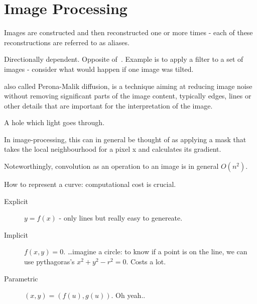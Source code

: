 \section{Image Processing}

\begin{definition}[Aliasing]
    Images are constructed and then reconstructed one or more times - 
    each of these reconstructions are referred to as aliases.
\end{definition}

\begin{definition}[Anisotropy]\label{anisotropy}
    Directionally dependent. Opposite of~.
    Example is to apply a filter to a set of images - consider
    what would happen if one image was tilted.
\end{definition}

\begin{definition}
    also called Perona-Malik diffusion, is a technique aiming at reducing image
    noise without removing significant parts of the image content, typically
    edges, lines or other details that are important for the interpretation of
    the image.

\end{definition}

\begin{definition}[Aperture]
    A hole which light goes through.
\end{definition}

\begin{definition}[Convolution]\label{convolution}
    In image-processing, this can in general be thought of as applying a mask
    that takes the local neighbourhood for a pixel x and calculates its
    gradient.

    Noteworthingly, convolution as an operation to an image is in general
    $O(n^{2})$.
\end{definition}

\begin{definition}
    How to represent a curve: computational cost is crucial.

    \begin{description}
        \item[Explicit] $y = f(x)$ - only lines but really easy to genereate.
        \item[Implicit] $f(x,y) = 0$. \dots imagine a circle: to know if a point
            is on the line, we can use pythagoras's $x^{2} + y^{2} - r^{2} = 0$. Costs a lot.
        \item[Parametric] $(x,y) = ( f(u), g(u))$. Oh yeah..
    \end{description}
    
\end{definition}

